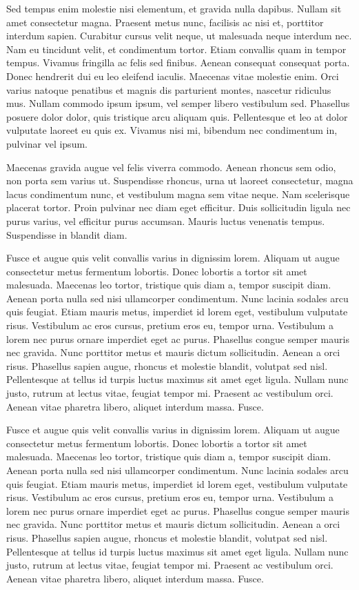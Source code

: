 Sed tempus enim molestie nisi elementum, et gravida nulla dapibus. 
Nullam sit amet consectetur magna. Praesent metus nunc, facilisis 
ac nisi et, porttitor interdum sapien. Curabitur cursus velit neque, 
ut malesuada neque interdum nec. Nam eu tincidunt velit, et condimentum 
tortor. Etiam convallis quam in tempor tempus. Vivamus fringilla 
ac felis sed finibus. Aenean consequat consequat porta. Donec hendrerit 
dui eu leo eleifend iaculis. Maecenas vitae molestie enim. Orci varius 
natoque penatibus et magnis dis parturient montes, nascetur ridiculus 
mus. Nullam commodo ipsum ipsum, vel semper libero vestibulum sed. 
Phasellus posuere dolor dolor, quis tristique arcu aliquam quis. 
Pellentesque et leo at dolor vulputate laoreet eu quis ex. 
Vivamus nisi mi, bibendum nec condimentum in, pulvinar vel ipsum.

Maecenas gravida augue vel felis viverra commodo. Aenean rhoncus sem 
odio, non porta sem varius ut. Suspendisse rhoncus, urna ut laoreet 
consectetur, magna lacus condimentum nunc, et vestibulum magna sem 
vitae neque. Nam scelerisque placerat tortor. Proin pulvinar nec diam 
eget efficitur. Duis sollicitudin ligula nec purus varius, vel 
efficitur purus accumsan. Mauris luctus venenatis tempus. Suspendisse 
in blandit diam.

Fusce et augue quis velit convallis varius in dignissim lorem. 
Aliquam ut augue consectetur metus fermentum lobortis. Donec lobortis 
a tortor sit amet malesuada. Maecenas leo tortor, tristique quis 
diam a, tempor suscipit diam. Aenean porta nulla sed nisi ullamcorper 
condimentum. Nunc lacinia sodales arcu quis feugiat. Etiam mauris 
metus, imperdiet id lorem eget, vestibulum vulputate risus. Vestibulum 
ac eros cursus, pretium eros eu, tempor urna. Vestibulum a lorem 
nec purus ornare imperdiet eget ac purus. Phasellus congue semper 
mauris nec gravida. Nunc porttitor metus et mauris dictum sollicitudin.
Aenean a orci risus. Phasellus sapien augue, rhoncus et molestie blandit, 
volutpat sed nisl. Pellentesque at tellus id turpis luctus maximus 
sit amet eget ligula. Nullam nunc justo, rutrum at lectus vitae, 
feugiat tempor mi. Praesent ac vestibulum orci. Aenean vitae pharetra 
libero, aliquet interdum massa. Fusce.

Fusce et augue quis velit convallis varius in dignissim lorem. 
Aliquam ut augue consectetur metus fermentum lobortis. Donec lobortis 
a tortor sit amet malesuada. Maecenas leo tortor, tristique quis 
diam a, tempor suscipit diam. Aenean porta nulla sed nisi ullamcorper 
condimentum. Nunc lacinia sodales arcu quis feugiat. Etiam mauris 
metus, imperdiet id lorem eget, vestibulum vulputate risus. Vestibulum 
ac eros cursus, pretium eros eu, tempor urna. Vestibulum a lorem 
nec purus ornare imperdiet eget ac purus. Phasellus congue semper 
mauris nec gravida. Nunc porttitor metus et mauris dictum sollicitudin.
Aenean a orci risus. Phasellus sapien augue, rhoncus et molestie blandit, 
volutpat sed nisl. Pellentesque at tellus id turpis luctus maximus 
sit amet eget ligula. Nullam nunc justo, rutrum at lectus vitae, 
feugiat tempor mi. Praesent ac vestibulum orci. Aenean vitae pharetra 
libero, aliquet interdum massa. Fusce.

